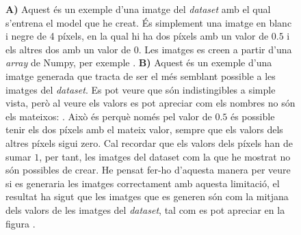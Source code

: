 \begin{figure}
	\caption{\textbf{A)} Aquest és un exemple d'una imatge del \textit{dataset} amb el qual s'entrena el model que he creat. És simplement una imatge en blanc i negre de 4 píxels, en la qual hi ha dos píxels amb un valor de $0.5$ i els altres dos amb un valor de $0$. Les imatges es creen a partir d'una \textit{array} de Numpy, per exemple  . \textbf{B)} Aquest és un exemple d'una imatge generada que tracta de ser el més semblant possible a les imatges del \textit{dataset}. Es pot veure que són indistingibles a simple vista, però al veure els valors es pot apreciar com els nombres no són els mateixos:  . Això és perquè només pel valor de $0.5$ és possible tenir els dos píxels amb el mateix valor, sempre que els valors dels altres píxels sigui zero. Cal recordar que els valors dels píxels han de sumar $1$, per tant, les imatges del dataset com la que he mostrat no són possibles de crear. He pensat fer-ho d'aquesta manera per veure si es generaria les imatges correctament amb aquesta limitació, el resultat ha sigut que les imatges que es generen són com la mitjana dels valors de les imatges del \textit{dataset}, tal com es pot apreciar en la figura \label{fig:700_images.}. }
	\label{fig:test_images}
\end{figure}


